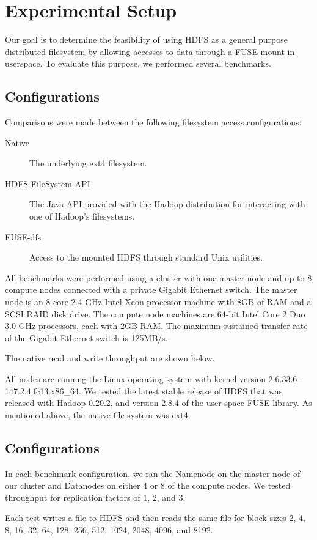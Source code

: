 \documentclass[11]{article}
\begin{document}
\section{Experimental Setup}
Our goal is to determine the feasibility of using HDFS as a general 
purpose distributed filesystem by allowing accesses to data through a 
FUSE mount in userspace. To evaluate this purpose, we performed several
benchmarks.

\subsection{Configurations}
Comparisons were made between the following filesystem access 
configurations:
\begin{description}
 \item[Native] The underlying ext4 filesystem.
 \item[HDFS FileSystem API] The Java API provided with the Hadoop 
distribution for interacting with one
of Hadoop's filesystems.
 \item[FUSE-dfs] Access to the mounted HDFS through standard Unix 
utilities. 
 \end{description} 

All benchmarks were performed using a cluster with one master node and 
up to 8 compute nodes connected with a private Gigabit Ethernet switch.
The master node is an 8-core 2.4 GHz Intel Xeon processor machine with 
8GB of RAM and a SCSI RAID disk drive. The compute node machines are 
64-bit Intel Core 2 Duo 3.0 GHz processors, each with 2GB RAM. The 
maximum sustained transfer rate of the Gigabit Ethernet switch is 
125MB/s.

The native read and write throughput are shown below.  

All nodes are running the Linux operating system with kernel version 
2.6.33.6-147.2.4.fc13.x86\_64. We tested the latest stable release of 
HDFS that was released with Hadoop 0.20.2, and version 2.8.4 of the
user space FUSE library. As mentioned above, the native file system 
was ext4. 

\subsection{Configurations}
In each benchmark configuration, we ran the Namenode on the master node
of our cluster and Datanodes on either 4 or 8 of the compute nodes. We 
tested throughput for replication factors of 1, 2, and 3.

Each test writes a file to HDFS and then reads the same file for block 
sizes 2, 4, 8, 16, 32, 64, 128, 256, 512, 1024, 2048, 4096, and  8192. 
\end{document}
